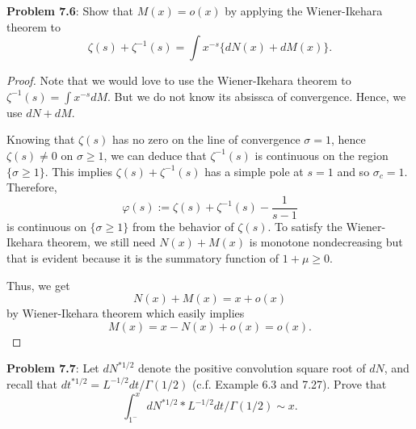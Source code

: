 \documentclass[12pt]{article}
\begin{document}
\fi

\textbf{Problem 7.6}: Show that $M(x) = o(x)$ by applying the Wiener-Ikehara theorem to
$$\zeta(s) + \zeta^{-1}(s) = \int x^{-s} \{dN(x) + dM(x)\}.$$

\begin{proof}
Note that we would love to use the Wiener-Ikehara theorem to $\zeta^{-1}(s) = \int x^{-s} dM$. But we do not know its absissca of convergence. Hence, we use $dN + dM$.

Knowing that $\zeta(s)$ has no zero on the line of convergence $\sigma = 1$, hence $\zeta(s) \not= 0$ on $\sigma \geq 1$, we can deduce that $\zeta^{-1}(s)$ is continuous on the region $\{\sigma \geq 1\}$. This implies $\zeta(s) + \zeta^{-1}(s)$ has a simple pole at $s = 1$ and so $\sigma_c = 1$. Therefore,
$$\varphi(s) := \zeta(s) + \zeta^{-1}(s) - \frac{1}{s - 1}$$
is continuous on $\{\sigma \geq 1\}$ from the behavior of $\zeta(s)$. To satisfy the Wiener-Ikehara theorem, we still need $N(x) + M(x)$ is monotone nondecreasing but that is evident because it is the summatory function of $1 + \mu \geq 0$.

Thus, we get
$$N(x) + M(x) = x + o(x)$$
by Wiener-Ikehara theorem which easily implies
$$M(x) = x - N(x) + o(x) = o(x).$$
\end{proof}

\textbf{Problem 7.7}: Let $dN^{*1/2}$ denote the positive convolution square root of $dN$, and recall that $dt^{*1/2} = L^{-1/2} dt / \Gamma(1/2)$ (c.f. Example 6.3 and 7.27). Prove that
$$\int_{1^-}^x dN^{*1/2} * L^{-1/2} dt / \Gamma(1/2) \sim x.$$
\end{document}
